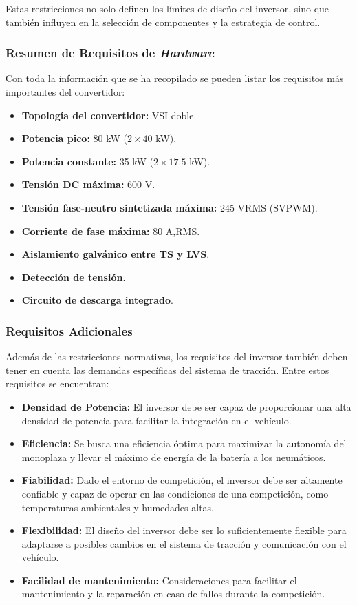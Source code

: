 Estas restricciones no solo definen los límites de diseño del inversor, sino que también influyen en la selección de componentes y la estrategia de control.

\subsubsection{Resumen de Requisitos de \textit{Hardware}}

Con toda la información que se ha recopilado se pueden listar los requisitos más importantes del convertidor:
\begin{itemize}
	\item \textbf{Topología del convertidor:} VSI doble.
	\item \textbf{Potencia pico:} 80 kW ($2\times40$ kW).
	\item \textbf{Potencia constante:} 35 kW ($2\times17.5$ kW).
	\item \textbf{Tensión DC máxima:} 600 V.
	\item \textbf{Tensión fase-neutro sintetizada máxima:} 245 VRMS (SVPWM).
	\item \textbf{Corriente de fase máxima:} 80 A,RMS.
	\item \textbf{Aislamiento galvánico entre TS y LVS}.
	\item \textbf{Detección de tensión}.
	\item \textbf{Circuito de descarga integrado}.
	
	
\end{itemize}

\subsubsection{Requisitos Adicionales}
Además de las restricciones normativas, los requisitos del inversor también deben tener en cuenta las demandas específicas del sistema de tracción. Entre estos requisitos se encuentran:

\begin{itemize}
	\item \textbf{Densidad de Potencia:} El inversor debe ser capaz de proporcionar una alta densidad de potencia para facilitar la integración en el vehículo.
	\item \textbf{Eficiencia:} Se busca una eficiencia óptima para maximizar la autonomía del monoplaza y llevar el máximo de energía de la batería a los neumáticos.
	\item \textbf{Fiabilidad:} Dado el entorno de competición, el inversor debe ser altamente confiable y capaz de operar en las condiciones de una competición, como temperaturas ambientales y humedades altas.
	\item \textbf{Flexibilidad:} El diseño del inversor debe ser lo suficientemente flexible para adaptarse a posibles cambios en el sistema de tracción y comunicación con el vehículo.
	\item \textbf{Facilidad de mantenimiento:} Consideraciones para facilitar el mantenimiento y la reparación en caso de fallos durante la competición.
\end{itemize}

